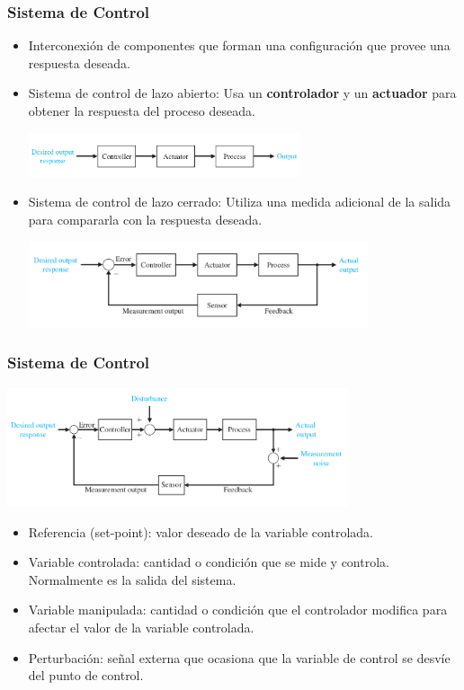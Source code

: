 \documentclass[aspectratio=169,handout]{beamer}
\theoremstyle{definition}
\theoremstyle{plain}
\theoremstyle{remark}
\begin{document}
\begin{frame}[<+->][c]\frametitle{Sistema de Control}
\begin{itemize}
  \item Interconexión de componentes que forman una configuración que provee una respuesta deseada.
  \item Sistema de control de lazo abierto: Usa un \textbf{controlador} y un \textbf{actuador} para obtener la respuesta del proceso deseada.
  \begin{center}
    \includegraphics[width=8cm]{images/openloopcontrol.png}
  \end{center}  
  \item Sistema de control de lazo cerrado: Utiliza una medida adicional de la salida para compararla con la respuesta deseada.
  \begin{center}
    \includegraphics[width=10cm]{images/closedloopcontrol.png}
  \end{center}  
\end{itemize}
\end{frame}

\begin{frame}[<+->][c]\frametitle{Sistema de Control}
  \vspace*{-0.2cm}
  \begin{center}
    \includegraphics[width=10cm]{images/closedloopcontrol2.png}
  \end{center}
  \vspace*{-0.7cm}
  \begin{itemize}
    \item Referencia (set-point): valor deseado de la variable controlada.
    \item Variable controlada: cantidad o condición que se mide y controla. Normalmente es la salida del sistema.
    \item Variable manipulada: cantidad o condición que el controlador modifica para afectar el valor de la variable controlada.
    \item Perturbación: señal externa que ocasiona que la variable de control se desvíe del punto de control.
  \end{itemize}
\end{frame}
\end{document}
